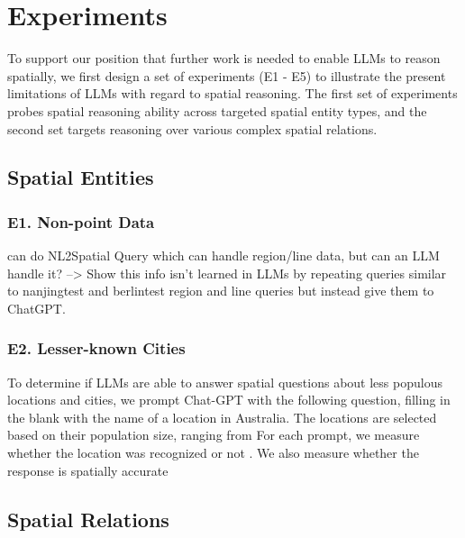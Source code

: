 \section{Experiments}
\label{section:experiments}

To support our position that further work is needed to enable LLMs to reason spatially, we first design a set of experiments (E1 - E5) to illustrate the present limitations of LLMs with regard to spatial reasoning.
The first set of experiments probes spatial reasoning ability across targeted spatial entity types, and the second set targets reasoning over various complex spatial relations.


\subsection{Spatial Entities} %

\subsubsection{E1. Non-point Data}
\cite{Liu2023} can do NL2Spatial Query which can handle region/line data, but can an LLM handle it?
--> Show this info isn't learned in LLMs by repeating queries similar to \cite{Liu2023} nanjingtest and berlintest region and line queries but instead give them to ChatGPT.

\subsubsection{E2. Lesser-known Cities}
To determine if LLMs are able to answer spatial questions about less populous locations and cities, we prompt Chat-GPT with the following question, filling in the blank with the name of a location in Australia.
The locations are selected based on their population size, ranging from 
For each prompt, we measure whether the location was recognized or not .
We also measure whether the response is spatially accurate 





\subsection{Spatial Relations} %


